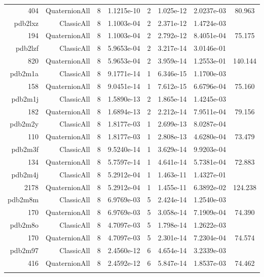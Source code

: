 \begin{xltabular}{\textwidth}{r|rcS[table-format=1.4e+2]cS[table-format=1.3e+2]S[table-format=1.4e+2]S[table-format=-1.3]}
404 & QuaternionAll & 8 & 1.1215e-10 & 2 & 1.025e-12 & 2.0237e-03 & 80.963\\  \addlinespace
pdb2lxz & ClassicAll & 8 & 1.1003e-04 & 2 & 2.371e-12 & 1.4724e-03 & \\
194 & QuaternionAll & 8 & 1.1003e-04 & 2 & 2.792e-12 & 8.4051e-04 & 75.175\\  \addlinespace
pdb2lzf & ClassicAll & 8 & 5.9653e-04 & 2 & 3.217e-14 & 3.0146e-01 & \\
820 & QuaternionAll & 8 & 5.9653e-04 & 2 & 3.959e-14 & 1.2553e-01 & 140.144\\  \addlinespace
pdb2m1a & ClassicAll & 8 & 9.1771e-14 & 1 & 6.346e-15 & 1.1700e-03 & \\
158 & QuaternionAll & 8 & 9.0451e-14 & 1 & 7.612e-15 & 6.6796e-04 & 75.160\\  \addlinespace
pdb2m1j & ClassicAll & 8 & 1.5890e-13 & 2 & 1.865e-14 & 1.4245e-03 & \\
182 & QuaternionAll & 8 & 1.6894e-13 & 2 & 2.212e-14 & 7.9511e-04 & 79.156\\  \addlinespace
pdb2m2y & ClassicAll & 8 & 1.8177e-03 & 1 & 2.699e-13 & 8.0287e-04 & \\
110 & QuaternionAll & 8 & 1.8177e-03 & 1 & 2.808e-13 & 4.6280e-04 & 73.479\\  \addlinespace
pdb2m3f & ClassicAll & 8 & 9.5240e-14 & 1 & 3.629e-14 & 9.9203e-04 & \\
134 & QuaternionAll & 8 & 5.7597e-14 & 1 & 4.641e-14 & 5.7381e-04 & 72.883\\  \addlinespace
pdb2m4j & ClassicAll & 8 & 5.2912e-04 & 1 & 1.463e-11 & 1.4327e-01 & \\
2178 & QuaternionAll & 8 & 5.2912e-04 & 1 & 1.455e-11 & 6.3892e-02 & 124.238\\  \addlinespace
pdb2m8m & ClassicAll & 8 & 6.9769e-03 & 5 & 2.424e-14 & 1.2540e-03 & \\
170 & QuaternionAll & 8 & 6.9769e-03 & 5 & 3.058e-14 & 7.1909e-04 & 74.390\\  \addlinespace
pdb2m8o & ClassicAll & 8 & 4.7097e-03 & 5 & 1.798e-14 & 1.2622e-03 & \\
170 & QuaternionAll & 8 & 4.7097e-03 & 5 & 2.301e-14 & 7.2304e-04 & 74.574\\  \addlinespace
pdb2m97 & ClassicAll & 8 & 2.4560e-12 & 6 & 4.654e-14 & 3.2339e-03 & \\
416 & QuaternionAll & 8 & 2.4592e-12 & 6 & 5.847e-14 & 1.8537e-03 & 74.462\\  \addlinespace

\end{xltabular}
